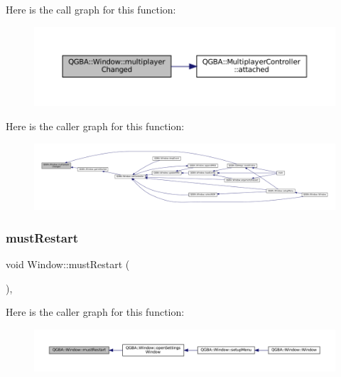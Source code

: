 Here is the call graph for this function\+:
\nopagebreak
\begin{figure}[H]
\begin{center}
\leavevmode
\includegraphics[width=350pt]{class_q_g_b_a_1_1_window_a26248c798c9d9d49932b7ae417598bea_cgraph}
\end{center}
\end{figure}
Here is the caller graph for this function\+:
\nopagebreak
\begin{figure}[H]
\begin{center}
\leavevmode
\includegraphics[width=350pt]{class_q_g_b_a_1_1_window_a26248c798c9d9d49932b7ae417598bea_icgraph}
\end{center}
\end{figure}
\mbox{\label{class_q_g_b_a_1_1_window_a1cd84a8fb644383b4e29f8d76bd3ba5a}} 
\subsubsection{\texorpdfstring{must\+Restart}{mustRestart}}
{\footnotesize\ttfamily void Window\+::must\+Restart (\begin{DoxyParamCaption}{ }\end{DoxyParamCaption})\hspace{0.3cm}{\ttfamily [private]}, {\ttfamily [slot]}}

Here is the caller graph for this function\+:
\nopagebreak
\begin{figure}[H]
\begin{center}
\leavevmode
\includegraphics[width=350pt]{class_q_g_b_a_1_1_window_a1cd84a8fb644383b4e29f8d76bd3ba5a_icgraph}
\end{center}
\end{figure}
\mbox{\label{class_q_g_b_a_1_1_window_a3660e2956b324697fecf11b138e832f0}} 
